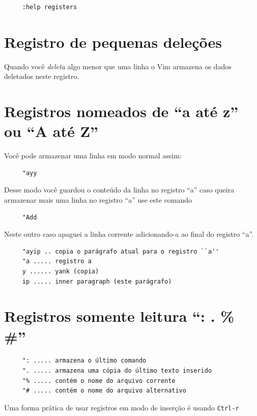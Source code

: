 \documentclass[10pt,a4paper,openany]{book}
\begin{document}
\begin{verbatim}
     :help registers
\end{verbatim}

\section{Registro de pequenas deleções}
\label{Registro de pequenas deleções}
Quando você {\em deleta} algo menor que uma linha o Vim armazena os dados deletados neste registro.

\section{Registros nomeados de ``a até z'' ou ``A até Z''}
\label{Registros nomeados de ``a até z'' ou ``A até Z''}
Você pode armazenar uma linha em modo normal assim:

\begin{verbatim}
     "ayy
\end{verbatim}

Desse modo você guardou o conteúdo da linha no registro ``a'' caso
queira armazenar mais uma linha no registro ``a'' use este comando

\begin{verbatim}
     "Add
\end{verbatim}

Neste outro caso apaguei a linha corrente adicionando-a ao final do registro ``a''.

\begin{verbatim}
     "ayip .. copia o parágrafo atual para o registro ``a''
     "a ..... registro a
     y ...... yank (copia)
     ip ..... inner paragraph (este parágrafo)
\end{verbatim}

\section{Registros somente leitura ``: . \% \#''}
\label{Registros somente leitura}

\begin{verbatim}
     ": ..... armazena o último comando
     ". ..... armazena uma cópia do último texto inserido
     "% ..... contém o nome do arquivo corrente
     "# ..... contém o nome do arquivo alternativo
\end{verbatim}

Uma forma prática de usar registros em modo de inserção é usando
\verb|Ctrl-r|
\end{document}
